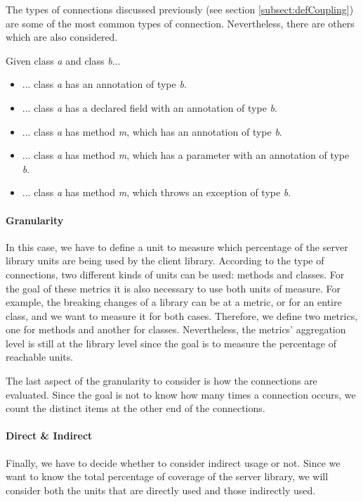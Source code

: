 The types of connections discussed previously (see section \ref{subsect:defCoupling}) are some of the most common types of connection. Nevertheless, there are others which are also considered.

Given class \textit{a} and class \textit{b}...

\begin{itemize}
  \item ... class \textit{a} has an annotation of type \textit{b}.
  \item ... class \textit{a} has a declared field with an annotation of type \textit{b}.
  \item ... class \textit{a} has method \textit{m}, which has an annotation of type \textit{b}.
  \item ... class \textit{a} has method \textit{m}, which has a parameter with an annotation of type \textit{b}.
  \item ... class \textit{a} has method \textit{m}, which throws an exception of type \textit{b}.
\end{itemize}

\paragraph{Granularity}
In this case, we have to define a unit to measure which percentage of the server library units are being used by the client library. According to the type of connections, two different kinds of units can be used: methods and classes. For the goal of these metrics it is also necessary to use both units of measure. For example, the breaking changes of a library can be at a metric, or for an entire class, and we want to measure it for both cases. Therefore, we define two metrics, one for methods and another for classes. Nevertheless, the metrics' aggregation level is still at the library level since the goal is to measure the percentage of reachable units.

The last aspect of the granularity to consider is how the connections are evaluated. Since the goal is not to know how many times a connection occurs, we count the distinct items at the other end of the connections.

\paragraph{Direct \& Indirect}
Finally, we have to decide whether to consider indirect usage or not. Since we want to know the total percentage of coverage of the server library, we will consider both the units that are directly used and those indirectly used.

